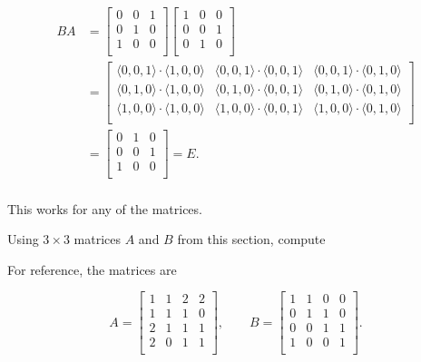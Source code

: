 \documentclass[../gatm_answers.tex]{subfiles}
\begin{document}
\begin{align*}
BA &= \begin{bmatrix}
0 & 0 & 1 \\
0 & 1 & 0 \\
1 & 0 & 0 \\
\end{bmatrix}\begin{bmatrix}
1 & 0 & 0 \\
0 & 0 & 1 \\
0 & 1 & 0 \\
\end{bmatrix} \\
&= \begin{bmatrix}
\langle0,0,1\rangle\cdot \langle1,0,0\rangle & \langle0,0,1\rangle\cdot \langle0,0,1\rangle & \langle0,0,1\rangle\cdot \langle0,1,0\rangle \\
\langle0,1,0\rangle\cdot \langle1,0,0\rangle & \langle0,1,0\rangle\cdot \langle0,0,1\rangle & \langle0,1,0\rangle\cdot \langle0,1,0\rangle \\
\langle1,0,0\rangle\cdot \langle1,0,0\rangle & \langle1,0,0\rangle\cdot \langle0,0,1\rangle & \langle1,0,0\rangle\cdot \langle0,1,0\rangle \\
\end{bmatrix} \\
&= \begin{bmatrix}
0 & 1 & 0 \\
0 & 0 & 1 \\
1 & 0 & 0 \\
\end{bmatrix} = E. \\
\end{align*}

This works for any of the matrices.

\begin{outer_problem}
\item Using $3\times 3$ matrices $A$ and $B$ from this section, compute
\end{outer_problem}

For reference, the matrices are

$$A = \begin{bmatrix}
1 & 1 & 2 & 2 \\
1 & 1 & 1 & 0 \\
2 & 1 & 1 & 1 \\
2 & 0 & 1 & 1 \\
\end{bmatrix},\qquad B = \begin{bmatrix}
1 & 1 & 0 & 0 \\
0 & 1 & 1 & 0 \\
0 & 0 & 1 & 1 \\
1 & 0 & 0 & 1 \\
\end{bmatrix}.$$
\end{document}

